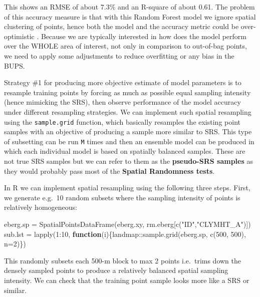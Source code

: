 \documentclass[
  graybox,natbib,nospthms]{svmono}
\newenvironment{Shaded}{\begin{snugshade}}{\end{snugshade}}
\newcommand{\AttributeTok}[1]{\textcolor[rgb]{0.61,0.61,0.61}{#1}}
\newcommand{\ControlFlowTok}[1]{\textcolor[rgb]{0.27,0.27,0.27}{\textbf{#1}}}
\newcommand{\DecValTok}[1]{\textcolor[rgb]{0.06,0.06,0.06}{#1}}
\newcommand{\FunctionTok}[1]{\textcolor[rgb]{0,0,0}{#1}}
\newcommand{\NormalTok}[1]{#1}
\newcommand{\OtherTok}[1]{\textcolor[rgb]{0.37,0.37,0.37}{#1}}
\newcommand{\SpecialCharTok}[1]{\textcolor[rgb]{0,0,0}{#1}}
\newcommand{\StringTok}[1]{\textcolor[rgb]{0.5,0.5,0.5}{#1}}
\begin{document}
This shows an RMSE of about 7.3\% and an R-square of about 0.61. The problem of this
accuracy measure is that with this Random Forest model we ignore spatial clustering
of points, hence both the model and the accuracy metric could be over-optimistic \citep{roberts2017cross, meyer2018improving}. Because we are typically interested in
how does the model perform over the WHOLE area of interest, not only in comparison
to out-of-bag points, we need to apply some adjustments to reduce overfitting or any bias in the BUPS.

Strategy \#1 for producing more objective estimate of model parameters is to
resample training points by forcing as much as possible equal sampling intensity
(hence mimicking the SRS), then observe performance of the model accuracy under
different resampling strategies. We can implement such spatial resampling using
the \texttt{sample.grid} function, which basically resamples the existing point samples
with an objective of producing a sample more similar to SRS. This type of
subsetting can be run \texttt{M} times and then an ensemble model can be produced in
which each individual model is based on spatially balanced samples. These are
not true SRS samples but we can refer to them as the \textbf{pseudo-SRS samples} as
they would probably pass most of the \textbf{Spatial Randomness tests}.

In R we can implement spatial resampling using the following three steps. First,
we generate e.g.~10 random subsets where the sampling intensity of points is
relatively homogeneous:

\begin{Shaded}
\begin{Highlighting}[]
\NormalTok{eberg.sp }\OtherTok{=} \FunctionTok{SpatialPointsDataFrame}\NormalTok{(eberg.xy, rm.eberg[}\FunctionTok{c}\NormalTok{(}\StringTok{"ID"}\NormalTok{,}\StringTok{"CLYMHT\_A"}\NormalTok{)])}
\NormalTok{sub.lst }\OtherTok{=} \FunctionTok{lapply}\NormalTok{(}\DecValTok{1}\SpecialCharTok{:}\DecValTok{10}\NormalTok{, }\ControlFlowTok{function}\NormalTok{(i)\{landmap}\SpecialCharTok{::}\FunctionTok{sample.grid}\NormalTok{(eberg.sp, }\FunctionTok{c}\NormalTok{(}\DecValTok{500}\NormalTok{, }\DecValTok{500}\NormalTok{), }\AttributeTok{n=}\DecValTok{2}\NormalTok{)\})}
\end{Highlighting}
\end{Shaded}

This randomly subsets each 500-m block to max 2 points i.e.~trims down the densely
sampled points to produce a relatively balanced spatial sampling intensity. We can
check that the training point sample looks more like a SRS or similar.
\end{document}
